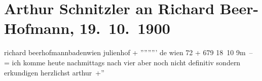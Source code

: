 

               \section[Arthur Schnitzler an Richard Beer-Hofmann, 19. 10. 1900]{ Arthur Schnitzler an Richard Beer-Hofmann,
                    19. 10. 1900}\nopagebreak{}\rehead{ }\begin{ledgroupsized}[t]{13cm}\normalsize\beginnumbering{} \toendnotes[C]{\smallbreak\pagebreak[2]} 
\pstart{}{\pb}richard beerhofmann\pend{}\pstart{}badenwien julienhof\pend{}{\bigskip}\pstart
           \noindent{}{\pb}+ ''''''''' de wien 72 + 679 18 10{ }9m –
                    \pend
           \pstart
           = ich komme heute nachmittags nach vier aber noch nicht definitiv sondern
                    erkundigen herzlichst \spacefill\mbox{arthur +''}\pend
           \endnumbering{}\end{ledgroupsized}  \newcommand{\dateiname}{L01079}\newcommand{\titel}{Arthur Schnitzler an Richard Beer-Hofmann, 19. 10. 1900}\newcommand{\editorInnen}{Martin Anton Müller und Gerd-Hermann Susen}
      